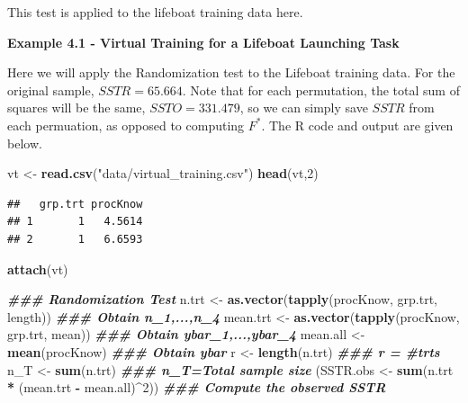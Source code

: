 \documentclass[
]{book}
\newenvironment{Shaded}{\begin{snugshade}}{\end{snugshade}}
\newcommand{\DecValTok}[1]{\textcolor[rgb]{0.00,0.00,0.81}{#1}}
\newcommand{\DocumentationTok}[1]{\textcolor[rgb]{0.56,0.35,0.01}{\textbf{\textit{#1}}}}
\newcommand{\FunctionTok}[1]{\textcolor[rgb]{0.13,0.29,0.53}{\textbf{#1}}}
\newcommand{\NormalTok}[1]{#1}
\newcommand{\OtherTok}[1]{\textcolor[rgb]{0.56,0.35,0.01}{#1}}
\newcommand{\SpecialCharTok}[1]{\textcolor[rgb]{0.81,0.36,0.00}{\textbf{#1}}}
\newcommand{\StringTok}[1]{\textcolor[rgb]{0.31,0.60,0.02}{#1}}
\begin{document}
This test is applied to the lifeboat training data here.

\textbf{Example 4.1 - Virtual Training for a Lifeboat Launching Task}

Here we will apply the Randomization test to the Lifeboat training data.
For the original sample, \(SSTR=65.664\). Note that for each
permutation, the total sum of squares will be the same,
\(SSTO=331.479\), so we can simply save \(SSTR\) from each permuation,
as opposed to computing \(F^*\). The R code and output are given below.

\begin{Shaded}
\begin{Highlighting}[]
\NormalTok{vt }\OtherTok{\textless{}{-}} \FunctionTok{read.csv}\NormalTok{(}\StringTok{"data/virtual\_training.csv"}\NormalTok{)}
\FunctionTok{head}\NormalTok{(vt,}\DecValTok{2}\NormalTok{)}
\end{Highlighting}
\end{Shaded}

\begin{verbatim}
##   grp.trt procKnow
## 1       1   4.5614
## 2       1   6.6593
\end{verbatim}

\begin{Shaded}
\begin{Highlighting}[]
\FunctionTok{attach}\NormalTok{(vt)}

\DocumentationTok{\#\#\# Randomization Test}
\NormalTok{n.trt }\OtherTok{\textless{}{-}} \FunctionTok{as.vector}\NormalTok{(}\FunctionTok{tapply}\NormalTok{(procKnow, grp.trt, length))  }\DocumentationTok{\#\#\# Obtain n\_1,...,n\_4}
\NormalTok{mean.trt }\OtherTok{\textless{}{-}} \FunctionTok{as.vector}\NormalTok{(}\FunctionTok{tapply}\NormalTok{(procKnow, grp.trt, mean)) }\DocumentationTok{\#\#\# Obtain ybar\_1,...,ybar\_4}
\NormalTok{mean.all }\OtherTok{\textless{}{-}} \FunctionTok{mean}\NormalTok{(procKnow)                             }\DocumentationTok{\#\#\# Obtain ybar}
\NormalTok{r }\OtherTok{\textless{}{-}} \FunctionTok{length}\NormalTok{(n.trt)                                     }\DocumentationTok{\#\#\# r = \#trts}
\NormalTok{n\_T }\OtherTok{\textless{}{-}} \FunctionTok{sum}\NormalTok{(n.trt)                                      }\DocumentationTok{\#\#\# n\_T=Total sample size}
\NormalTok{(SSTR.obs }\OtherTok{\textless{}{-}} \FunctionTok{sum}\NormalTok{(n.trt }\SpecialCharTok{*}\NormalTok{ (mean.trt }\SpecialCharTok{{-}}\NormalTok{ mean.all)}\SpecialCharTok{\^{}}\DecValTok{2}\NormalTok{))     }\DocumentationTok{\#\#\# Compute the observed SSTR}
\end{Highlighting}
\end{Shaded}
\end{document}
